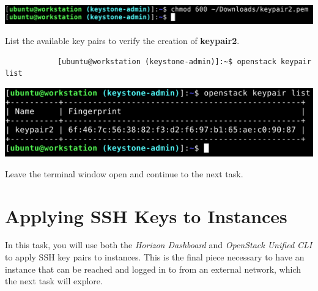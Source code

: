 \documentclass[letterpaper, 12pt]{article}
\begin{document}
\begin{enumerate}
\begin{labstep}
        \begin{center}
            \includegraphics[width=\linewidth]{images/part3/step11.png}
        \end{center}
    \end{labstep}

    \begin{labstep}
        List the available key pairs to verify the creation of \textbf{keypair2}.
        \begin{lstlisting}
            [ubuntu@workstation (keystone-admin)]:~$ openstack keypair list
        \end{lstlisting}

        \begin{center}
            \includegraphics[width=\linewidth]{images/part3/step12.png}
        \end{center}
    \end{labstep}

    \begin{labstep}
        Leave the terminal window open and continue to the next task.
    \end{labstep}

\end{enumerate}

\section{Applying SSH Keys to Instances}\label{sec:applying-ssh-keys-to-instances}
In this task, you will use both the \textit{Horizon Dashboard} and \textit{OpenStack Unified CLI} to apply SSH key pairs to instances.
This is the final piece necessary to have an instance that can be reached and logged in to from an external network, which the next task will explore.
\end{document}
